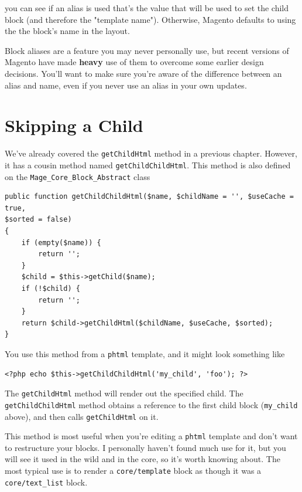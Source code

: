 \documentclass[oneside]{book}
\begin{document}
you can see if an alias is used that's the value that will be used to set the child block (and therefore the "template name").  Otherwise, Magento defaults to using the the block's name in the layout.

Block aliases are a feature you may never personally use, but recent versions of Magento have made \textbf{heavy} use of them to overcome some earlier design decisions. You'll want to make sure you're aware of the difference between an alias and name, even if you never use an alias in your own updates.

\section{Skipping a Child}

We've already covered the \footnotesize\texttt{getChildHtml} \normalsize  method in a previous chapter.  However, it has a cousin method named \footnotesize\texttt{getChildChildHtml}\normalsize.  This method is also defined on the \footnotesize\texttt{Mage\_Core\_Block\_Abstract} \normalsize  class

\begin{lstlisting}
public function getChildChildHtml($name, $childName = '', $useCache = true,
$sorted = false)
{
    if (empty($name)) {
        return '';
    }
    $child = $this->getChild($name);
    if (!$child) {
        return '';
    }
    return $child->getChildHtml($childName, $useCache, $sorted);
}

\end{lstlisting}


You use this method from a \footnotesize\texttt{phtml} \normalsize  template, and it might look something like

\begin{lstlisting}
<?php echo $this->getChildChildHtml('my_child', 'foo'); ?>

\end{lstlisting}


The \footnotesize\texttt{getChildHtml} \normalsize  method will render out the specified child.  The \footnotesize\texttt{getChildChildHtml} \normalsize  method obtains a reference to the first child block (\footnotesize\texttt{my\_child} \normalsize  above), and then calls \footnotesize\texttt{getChildHtml} \normalsize  on it.  

This method is most useful when you're editing a \footnotesize\texttt{phtml} \normalsize  template and don't want to restructure your blocks.  I personally haven't found much use for it, but you will see it used in the wild and in the core, so it's worth knowing about.  The most typical use is to render a \footnotesize\texttt{core/template} \normalsize  block as though it was a \footnotesize\texttt{core/text\_list} \normalsize  block.
\end{document}
